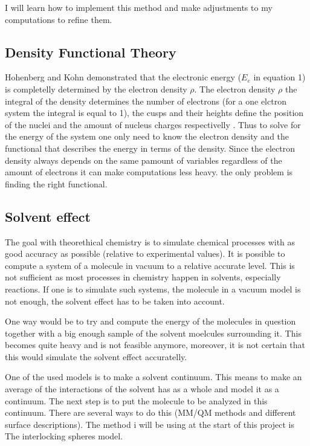 \documentclass[a4paper,11pt]{article}
\begin{document}
I will learn how to implement this method and make adjustments to my computations to refine them.

\subsection{Density Functional Theory}

Hohenberg and Kohn
demonstrated that the
electronic energy ($E_e$ in equation 1) is completelly determined by
the electron density $\rho$\cite{Jensen:2017,parr1994density}. The electron density $\rho$ the integral of the
density determines the number of electrons (for a one elctron system
the integral is equal to 1), the cusps and their heights define the
position of the nuclei and the amount of nucleus charges
respectivelly \cite{Koch:2001dn}.  Thus to solve for the energy of the system one only
need to know the electron density and the functional that describes
the energy in terms of the density. Since the electron density always
depends on the same pamount of variables regardless of the amount of
electrons it can make computations less heavy. the only problem is
finding the right functional.


\subsection{Solvent effect}

The goal with theorethical chemistry is to simulate chemical processes
with as good accuracy as possible (relative to experimental
values). It is possible to compute a system of a molecule in vacuum to
a relative accurate level. This is not sufficient as most processes in
chemistry happen in solvents, especially reactions. If one is to
simulate such systems, the molecule in a vacuum model is not enough,
the solvent effect has to be taken into account.

One way would be to try and compute the energy of the molecules in
question together with a big enough sample of the solvent moelcules
surrounding it. This becomes quite heavy and is not feasible anymore,
moreover, it is not certain that this would simulate the solvent
effect accuratelly.

One of the used models is to make a solvent continuum. This means to
make an average of the interactions of the solvent has as a whole and model it as a continuum. The next step is to put the molecule to be analyzed in this continuum. There are several ways to do this (MM/QM
methods and different surface descriptions). The method i will be
using at the start of this project is The interlocking spheres model.
\end{document}
